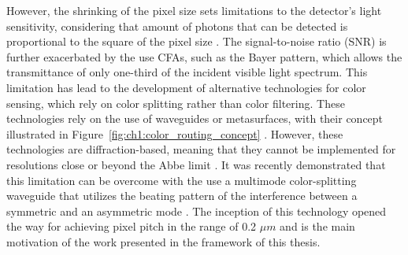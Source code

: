 However, the shrinking of the pixel size sets limitations to the detector's light sensitivity, considering that amount of photons that can be detected is proportional to the square of the pixel size \cite{Kim2024FreeformSensors}. The signal-to-noise ratio (SNR) is further exacerbated by the use CFAs, such as the Bayer pattern, which allows the transmittance of only one-third of the incident visible light spectrum. This limitation has lead to the development of alternative technologies for color sensing, which rely on color splitting rather than color filtering. These technologies rely on the use of waveguides or metasurfaces, with their concept illustrated in Figure~\ref{fig:ch1:color_routing_concept}   \cite{Nishiwaki2013EfficientSensors, Miyata2019High-SensitivityMetasurfaces, Kim2024FreeformSensors, Zou2022Pixel-levelMetasurfaces, Catrysse2022SubwavelengthEfficiency}. However, these technologies are diffraction-based, meaning that they cannot be implemented for resolutions close or beyond the Abbe limit \cite{Shramkova2024HighSeparation}. It was recently demonstrated that this limitation can be overcome with the use a multimode color-splitting waveguide that utilizes the beating pattern of the interference between a symmetric and an asymmetric mode \cite{Kang2023Wafer-level-integratedSplitters}. The inception of this technology opened the way for achieving pixel pitch in the range of 0.2 $\mu m$ and is the main motivation of the work presented in the framework of this thesis. 


